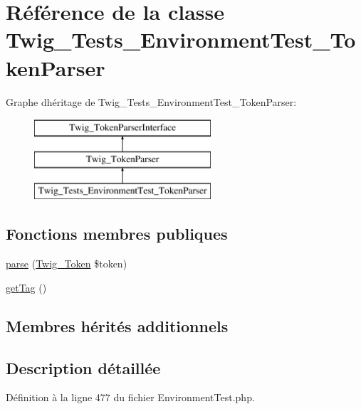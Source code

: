 \hypertarget{class_twig___tests___environment_test___token_parser}{}\section{Référence de la classe Twig\+\_\+\+Tests\+\_\+\+Environment\+Test\+\_\+\+Token\+Parser}
\label{class_twig___tests___environment_test___token_parser}
Graphe d\textquotesingle{}héritage de Twig\+\_\+\+Tests\+\_\+\+Environment\+Test\+\_\+\+Token\+Parser\+:\begin{figure}[H]
\begin{center}
\leavevmode
\includegraphics[height=3.000000cm]{class_twig___tests___environment_test___token_parser}
\end{center}
\end{figure}
\subsection*{Fonctions membres publiques}
\begin{DoxyCompactItemize}
\item 
\hyperlink{class_twig___tests___environment_test___token_parser_a5dfa2e269321584fb74e8b43dabe0efd}{parse} (\hyperlink{class_twig___token}{Twig\+\_\+\+Token} \$token)
\item 
\hyperlink{class_twig___tests___environment_test___token_parser_ab86ba36154b20e6bbfa3ba705f12f9d6}{get\+Tag} ()
\end{DoxyCompactItemize}
\subsection*{Membres hérités additionnels}


\subsection{Description détaillée}


Définition à la ligne 477 du fichier Environment\+Test.\+php.



